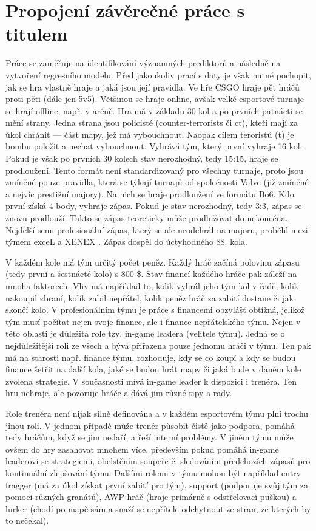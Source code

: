 \newpage
\section{Propojení závěrečné práce s titulem}
Práce se zaměřuje na identifikování významných prediktorů a následně na vytvoření regresního modelu. Před jakoukoliv prací s daty je však nutné pochopit, jak se hra vlastně hraje
a jaká jsou její pravidla. Ve hře \ac{CSGO} hraje pět hráčů proti pěti (dále jen 5v5). Většinou se hraje online, avšak velké esportové turnaje se hrají offline, např. v aréně.
Hra má v základu 30 kol a po  prvních patnácti se mění strany. Jedna strana jsou policisté (counter-terrorists či ct), kteří mají za úkol chránit  --- část mapy,
jež má vybouchnout. Naopak cílem teroristů (t) je bombu položit a  nechat vybouchnout. Vyhrává tým, který první vyhraje 16 kol. Pokud je však po prvních 30 kolech
stav nerozhodný, tedy 15:15, hraje se prodloužení. Tento formát není standardizovaný pro všechny turnaje, proto jsou zmíněné pouze pravidla, která se týkají turnajů od společnosti
Valve (již zmíněné a nejvíc prestižní majory). Na nich se hraje prodloužení ve formátu Bo6. Kdo první získá 4 body, vyhraje zápas. Pokud je stav nerozhodný, tedy 3:3, zápas se znovu
prodlouží. Takto se zápas teoreticky může prodlužovat do nekonečna. Nejdelší semi-profesionální zápas, který se ale neodehrál na majoru, proběhl mezi týmem exceL a
XENEX \cite{professeur_hltvorg_2015}. Zápas dospěl do úctyhodného 88. kola.

V každém kole má tým určitý počet peněz. Každý hráč začíná polovinu zápasu (tedy první a šestnácté kolo) s 800 \$. Stav financí každého hráče pak záleží na mnoha faktorech.
Vliv má například to, kolik vyhrál jeho tým kol v řadě, kolik nakoupil zbraní, kolik zabil nepřátel, kolik peněz hráč za zabití dostane či jak skončí kolo. V profesionálním
týmu je práce s financemi obzvlášť obtížná, jelikož tým musí počítat nejen svoje finance, ale i finance nepřátelského týmu. Nejen v této oblasti je důležitá role tzv. in-game
leadera (velitele týmu). Jedná se o nejdůležitější roli ze všech a bývá přiřazena pouze jednomu hráči v týmu. Ten pak má na starosti např. finance týmu, rozhoduje, kdy se co
koupí a kdy se budou finance šetřit na další kola, jaké se budou hrát mapy či jaká bude v daném kole zvolena strategie. V současnosti mívá in-game leader k dispozici i trenéra.
Ten hru nehraje, ale pozoruje hráče a dává jim různé tipy a rady.

Role trenéra není nijak silně definována a v každém esportovém týmu plní trochu jinou roli. V jednom případě může trenér působit čistě jako podpora, pomáhá tedy hráčům, když
se jim nedaří, a řeší interní problémy. V jiném týmu může ovšem do hry zasahovat mnohem více, především pokud pomáhá in-game leaderovi se strategiemi, obelstěním soupeře či
sledováním předchozích zápasů pro kontinuální zlepšování týmu. Dalšími rolemi v týmu mohou být například entry fragger (má za úkol získat první zabití pro tým), support
(podporuje svůj tým za pomoci různých granátů), AWP hráč (hraje primárně s odstřelovací puškou) a lurker (chodí po mapě sám a snaží se nepřítele
odchytnout ze stran, ze kterých by to nečekal).

